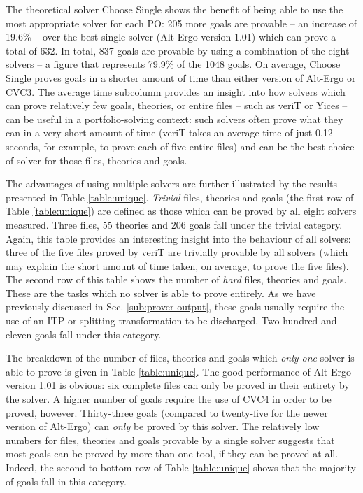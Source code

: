 The theoretical solver \textsf{Choose Single} shows the benefit of being able to use the most appropriate solver for each PO: 205 more goals are provable -- an increase of 19.6\% -- over the best single solver (Alt-Ergo version 1.01) which can prove a total of 632. 
In total, 837 goals are provable by using a combination of the eight solvers -- a figure that represents 79.9\% of the 1048 goals. 
On average, \textsf{Choose Single} proves goals in a shorter amount of time than either version of Alt-Ergo or CVC3. 
The average time subcolumn provides an insight into how solvers which can prove relatively few goals, theories, or entire files -- such as veriT or Yices -- can be useful in a portfolio-solving context: such solvers often prove what they can in a very short amount of time (veriT takes an average time of just 0.12 seconds, for example, to prove each of five entire files) and can be the best choice of solver for those files, theories and goals. 

The advantages of using multiple solvers are further illustrated by the results presented in Table \ref{table:unique}. \textit{Trivial} files, theories and goals (the first row of Table \ref{table:unique}) are defined as those which can be proved by all eight solvers measured. 
Three files, 55 theories and 206 goals fall under the trivial category.
Again, this table provides an interesting insight into the behaviour of all solvers: three of the five files proved by veriT are trivially provable by all solvers (which may explain the short amount of time taken, on average, to prove the five files). 
The second row of this table shows the number of \textit{hard} files, theories and goals. 
These are the tasks which no solver is able to prove entirely.
As we have previously discussed in Sec. \ref{sub:prover-output}, these goals usually require the use of an ITP or splitting transformation to be discharged.
Two hundred and eleven goals fall under this category.

The breakdown of the number of files, theories and goals which \textit{only one} solver is able to prove is given in Table \ref{table:unique}.
The good performance of Alt-Ergo version 1.01 is obvious: six complete files can only be proved in their entirety by the solver. 
A higher number of goals require the use of CVC4 in order to be proved, however.
Thirty-three goals (compared to twenty-five for the newer version of Alt-Ergo) can \textit{only} be proved by this solver.
The relatively low numbers for files, theories and goals provable by a single solver suggests that most goals can be proved by more than one tool, if they can be proved at all.
Indeed, the second-to-bottom row of Table \ref{table:unique} shows that the majority of goals fall in this category. 

